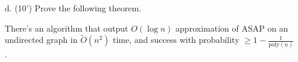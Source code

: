     \begin{itemize}
        \item [d. (10')] Prove the following theorem. 

        \begin{theorem}
            There's an algorithm that output $O(\log n)$ approximation of ASAP on an undirected graph in $\tilde{O}(n ^ 2)$ time, and success with probability $\ge 1 - \frac 1{\text{poly}(n)}$.
        \end{theorem}
    \end{itemize}